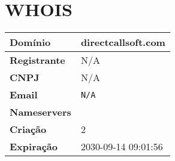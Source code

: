 
\section{WHOIS}
\begin{tabular}{|l|l|}
\hline
\textbf{Domínio} & directcallsoft.com \\ \hline
\textbf{Registrante} & N/A \\ \hline
\textbf{CNPJ} & N/A \\ \hline
\textbf{Email} & \texttt{N/A} \\ \hline
\textbf{Nameservers} &  \\ \hline
\textbf{Criação} & 2 \\ \hline
\textbf{Expiração} & 2030-09-14 09:01:56 \\ \hline
\end{tabular}
